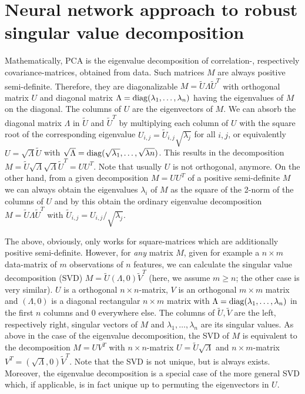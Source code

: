 \section{Neural network approach to robust singular value decomposition}\label{sec:algorithm}


Mathematically, PCA is the eigenvalue decomposition of correlation-, respectively cov\-ariance-matrices, obtained from data. Such matrices $M$ are always positive semi-definite. Therefore, they are diagonalizable $M = \tilde{U}\Lambda \tilde{U}^T$ with orthogonal matrix $U$ and diagonal matrix $\Lambda = \mathrm{diag}(\lambda_1,\dots,\lambda_n)$ having the eigenvalues of $M$ on the diagonal. The columns of $U$ are the eigenvectors of $M$. We can absorb the diagonal matrix $\Lambda$ in $\tilde{U}$ and $\tilde{U}^T$ by multiplying each column of $U$ with the square root of the corresponding eigenvalue $U_{i,j} = \tilde{U}_{i,j} \sqrt{\lambda_j}$ for all $i,j$, or equivalently $U = \sqrt{\Lambda}\tilde{U}$ with $\sqrt{\Lambda} = \mathrm{diag}(\sqrt{\lambda_1},\dots,\sqrt{\lambda{n}})$. This results in the decomposition $M = \tilde{U}\sqrt{\Lambda} \sqrt{\Lambda} \tilde{U}^T = UU^T$. Note that usually $U$ is not orthogonal, anymore. On the other hand, from a given decomposition $M = UU^T$ of a positive semi-definite $M$ we can always obtain the eigenvalues $\lambda_i$ of $M$ as the square of the 2-norm of the columns of $U$ and by this obtain the ordinary eigenvalue decomposition $M = \tilde{U}\Lambda\tilde{U}^T$ with $\tilde{U}_{i,j} = U_{i,j}/\sqrt{\lambda_j}$.

The above, obviously, only works for square-matrices which are additionally positive semi-definite. However, for \textit{any} matrix $M$, given for example a $n\times m$ data-matrix of $m$ observations of $n$ features, we can calculate the singular value decomposition (SVD) $M = \tilde{U} (\Lambda, 0) \tilde{V}^T$ (here, we assume $m\geq n$; the other case is very similar). $U$ is a orthogonal $n\times n$-matrix, $V$ is an orthogonal $m\times m$ matrix and $(\Lambda, 0)$ is a diagonal rectangular $n\times m$ matrix with $\Lambda = \mathrm{diag}(\lambda_1,\dots,\lambda_n)$ in the first $n$ columns and $0$ everywhere else. The columns of $\tilde{U},\tilde{V}$ are the left, respectively right, singular vectors of $M$ and $\lambda_1,\dots,\lambda_n$ are its singular values. As above in the case of the eigenvalue decomposition, the SVD of $M$ is equivalent to the decomposition $M = UV^T$ with $n\times n$-matrix $U = \tilde{U}\sqrt{\Lambda}$ and $n\times m$-matrix $V^T = (\sqrt{\Lambda}, 0) \tilde{V}^T$. Note that the SVD is not unique, but is always exists. Moreover, the eigenvalue decomposition is a special case of the more general SVD which, if applicable, is in fact unique up to permuting the eigenvectors in $U$.

